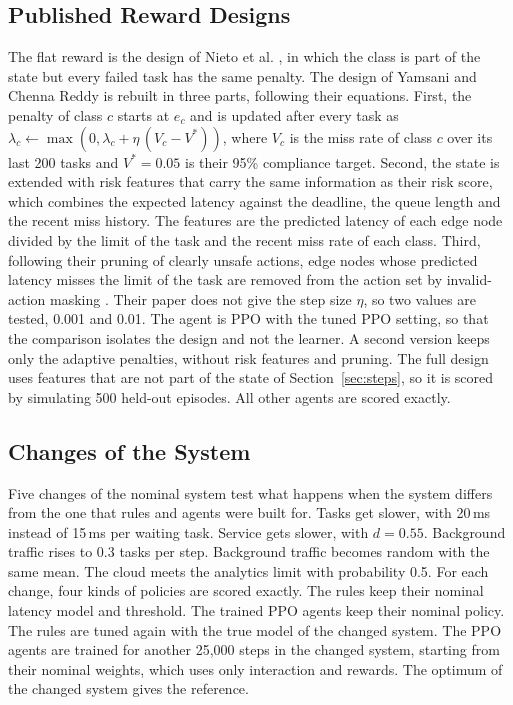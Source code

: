 \subsection{Published Reward Designs}
The flat reward is the design of Nieto et al. \cite{nieto2024}, in which the class is part of the state but every failed task has the same penalty. The design of Yamsani and Chenna Reddy \cite{yamsani2026} is rebuilt in three parts, following their equations. First, the penalty of class $c$ starts at $e_c$ and is updated after every task as $\lambda_c \leftarrow \max(0, \lambda_c + \eta\,(V_c - V^\ast))$, where $V_c$ is the miss rate of class $c$ over its last 200 tasks and $V^\ast = 0.05$ is their 95\% compliance target. Second, the state is extended with risk features that carry the same information as their risk score, which combines the expected latency against the deadline, the queue length and the recent miss history. The features are the predicted latency of each edge node divided by the limit of the task and the recent miss rate of each class. Third, following their pruning of clearly unsafe actions, edge nodes whose predicted latency misses the limit of the task are removed from the action set by invalid-action masking \cite{huang2022}. Their paper does not give the step size $\eta$, so two values are tested, 0.001 and 0.01. The agent is PPO with the tuned PPO setting, so that the comparison isolates the design and not the learner. A second version keeps only the adaptive penalties, without risk features and pruning. The full design uses features that are not part of the state of Section~\ref{sec:steps}, so it is scored by simulating 500 held-out episodes. All other agents are scored exactly.

\subsection{Changes of the System}
Five changes of the nominal system test what happens when the system differs from the one that rules and agents were built for. Tasks get slower, with 20\,ms instead of 15\,ms per waiting task. Service gets slower, with $d = 0.55$. Background traffic rises to 0.3 tasks per step. Background traffic becomes random with the same mean. The cloud meets the analytics limit with probability 0.5. For each change, four kinds of policies are scored exactly. The rules keep their nominal latency model and threshold. The trained PPO agents keep their nominal policy. The rules are tuned again with the true model of the changed system. The PPO agents are trained for another 25,000 steps in the changed system, starting from their nominal weights, which uses only interaction and rewards. The optimum of the changed system gives the reference.

